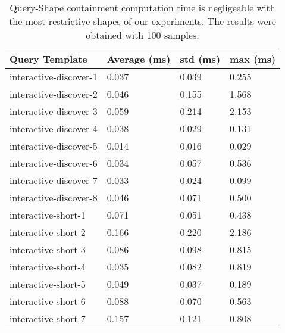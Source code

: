 \begin{table}
	\begin{center}
		\begin{tabular}{|l|l|l|l|}
			\hline
			Query Template & Average (ms) & std (ms) & max (ms) \\
			\hline
			interactive-discover-1 & 0.037 & 0.039 & 0.255 \\
			\hline
			interactive-discover-2 & 0.046 & 0.155 & 1.568 \\
			\hline
			interactive-discover-3 & 0.059 & 0.214 & 2.153 \\
			\hline
			interactive-discover-4 & 0.038 & 0.029 & 0.131 \\
			\hline
			interactive-discover-5 & 0.014 & 0.016 & 0.029 \\
			\hline
			interactive-discover-6 & 0.034 & 0.057 & 0.536 \\
			\hline
			interactive-discover-7 & 0.033 & 0.024 & 0.099 \\
			\hline
			interactive-discover-8 & 0.046 & 0.071 & 0.500 \\
			\hline
			interactive-short-1 & 0.071 & 0.051 & 0.438 \\
			\hline
			interactive-short-2 & 0.166 & 0.220 & 2.186 \\
			\hline
			interactive-short-3 & 0.086 & 0.098 & 0.815 \\
			\hline
			interactive-short-4 & 0.035 & 0.082 & 0.819 \\
			\hline
			interactive-short-5 & 0.049 & 0.037 & 0.189 \\
			\hline
			interactive-short-6 & 0.088 & 0.070 & 0.563 \\
			\hline
			interactive-short-7 & 0.157 & 0.121 & 0.808 \\
			\hline
		\end{tabular}
	\end{center}
	\caption{Query-Shape containment computation time is negligeable with the most restrictive shapes of our experiments. The results were obtained with 100 samples.}
	\label{tab:queryShapeContainmentEval}
\end{table}
